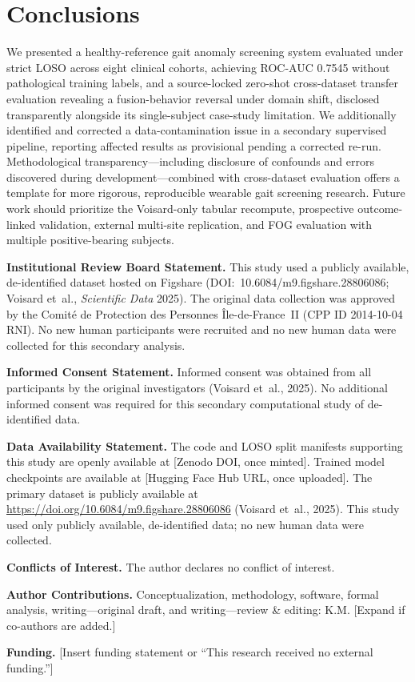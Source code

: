 \section{Conclusions}

We presented a healthy-reference gait anomaly screening system evaluated under strict LOSO across eight clinical cohorts, achieving ROC-AUC 0.7545 without pathological training labels, and a source-locked zero-shot cross-dataset transfer evaluation revealing a fusion-behavior reversal under domain shift, disclosed transparently alongside its single-subject case-study limitation. We additionally identified and corrected a data-contamination issue in a secondary supervised pipeline, reporting affected results as provisional pending a corrected re-run. Methodological transparency---including disclosure of confounds and errors discovered during development---combined with cross-dataset evaluation offers a template for more rigorous, reproducible wearable gait screening research. Future work should prioritize the Voisard-only tabular recompute, prospective outcome-linked validation, external multi-site replication, and FOG evaluation with multiple positive-bearing subjects.

\vspace{1em}
\noindent\textbf{Institutional Review Board Statement.} This study used a publicly available, de-identified dataset hosted on Figshare (DOI:~10.6084/m9.figshare.28806086; Voisard et~al., \textit{Scientific Data} 2025). The original data collection was approved by the Comit\'e de Protection des Personnes \^Ile-de-France~II (CPP ID 2014-10-04 RNI). No new human participants were recruited and no new human data were collected for this secondary analysis.

\noindent\textbf{Informed Consent Statement.} Informed consent was obtained from all participants by the original investigators (Voisard et~al., 2025). No additional informed consent was required for this secondary computational study of de-identified data.

\noindent\textbf{Data Availability Statement.} The code and LOSO split manifests supporting this study are openly available at [Zenodo DOI, once minted]. Trained model checkpoints are available at [Hugging Face Hub URL, once uploaded]. The primary dataset is publicly available at \url{https://doi.org/10.6084/m9.figshare.28806086} (Voisard et~al., 2025). This study used only publicly available, de-identified data; no new human data were collected.

\noindent\textbf{Conflicts of Interest.} The author declares no conflict of interest.

\noindent\textbf{Author Contributions.} Conceptualization, methodology, software, formal analysis, writing---original draft, and writing---review \& editing: K.M. [Expand if co-authors are added.]

\noindent\textbf{Funding.} [Insert funding statement or ``This research received no external funding.'']


